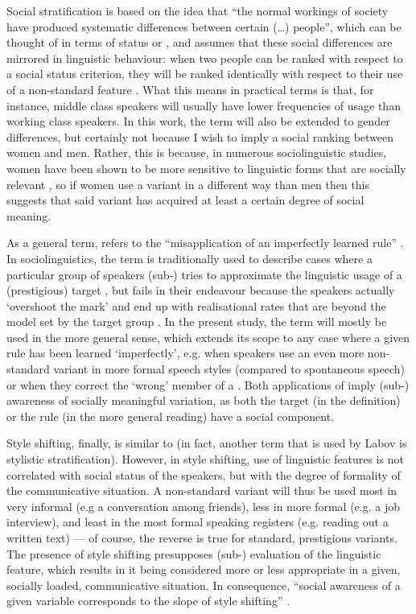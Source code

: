 Social stratification is based on the idea that ``the normal workings of society have produced systematic differences between certain (\ldots) people'', which can be thought of in terms of status or , and assumes that these social differences are mirrored in linguistic behaviour: when two people can be ranked with respect to a social status criterion, they will be ranked identically with respect to their use of a non-standard feature \parencite[44--45]{labov1972}.
What this means in practical terms is that, for instance, middle class speakers will usually have lower frequencies of usage than working class speakers.
In this work, the term will also be extended to gender differences, but certainly not because I wish to imply a social ranking between women and men.
Rather, this is because, in numerous sociolinguistic studies, women have been shown to be more sensitive to linguistic forms that are socially relevant \parencite[cf.][290--291]{labov2001a}, so if women use a variant in a different way than men then this suggests that said variant has acquired at least a certain degree of social meaning.

As a general term,  refers to the ``misapplication of an imperfectly learned rule'' \parencite[126]{labov1972}.
In sociolinguistics, the term is traditionally used to describe cases where a particular group of speakers (sub-) tries to approximate the linguistic usage of a (prestigious) target , but fails in their endeavour because the speakers actually `overshoot the mark' and end up with realisational rates that are beyond the model set by the target group \parencite[cf.][126]{labov1972}.
In the present study, the term  will mostly be used in the more general sense, which extends its scope to any case where a given rule has been learned `imperfectly', e.g. when speakers use an even more non-standard variant in more formal speech styles (compared to spontaneous speech) or when they correct the `wrong' member of a .
Both applications of  imply (sub-) awareness of socially meaningful variation, as both the target (in the  definition) or the rule (in the more general reading) have a social component.

Style shifting, finally, is similar to  (in fact, another term that is used by Labov is stylistic stratification).
However, in style shifting, use of linguistic features is not correlated with social status of the speakers, but with the degree of formality of the communicative situation.
A non-standard variant will thus be used most in very informal (e.g a conversation among friends), less in more formal (e.g. a job interview), and least in the most formal speaking registers (e.g. reading out a written text) --- of course, the reverse is true for standard, prestigious variants.
The presence of style shifting presupposes (sub-) evaluation of the linguistic feature, which results in it being considered more or less appropriate in a given, socially loaded, communicative situation.
In consequence, ``social awareness of a given variable corresponds to the slope of style shifting'' \parencite[196]{labov2001a}.

